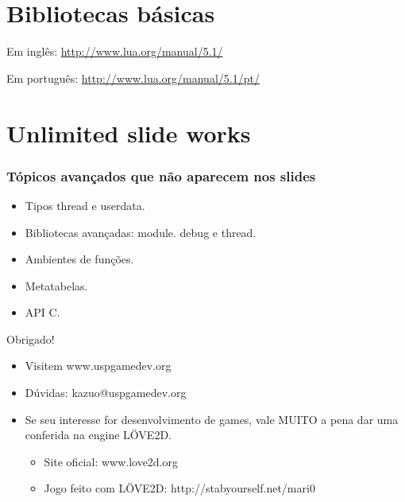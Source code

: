 \documentclass[brazil]{beamer}
\begin{document}
\section{Bibliotecas básicas}
\begin{frame}
  \vspace{15pt}
  Em inglês: \url{http://www.lua.org/manual/5.1/}

  Em português: \url{http://www.lua.org/manual/5.1/pt/}
\end{frame}
\section{Unlimited slide works}
\begin{frame}
  \frametitle{Tópicos avançados que não aparecem nos slides}
  \begin{itemize}
    \item Tipos thread e userdata.
    \item Bibliotecas avançadas: module. debug e thread.
    \item Ambientes de funções.
    \item Metatabelas.
    \item API C.
  \end{itemize}
\end{frame}
\begin{frame}
  \begin{center}
    \LARGE Obrigado!
  \end{center}
  \begin{itemize}
    \item Visitem www.uspgamedev.org
    \item Dúvidas: kazuo@uspgamedev.org
    \item Se seu interesse for desenvolvimento de games,
          vale MUITO a pena dar uma conferida na engine
          LÖVE2D.
    \begin{itemize}
      \item Site oficial: www.love2d.org
      \item Jogo feito com LÖVE2D: http://stabyourself.net/mari0
    \end{itemize}
  \end{itemize}
\end{frame}
\end{document}
